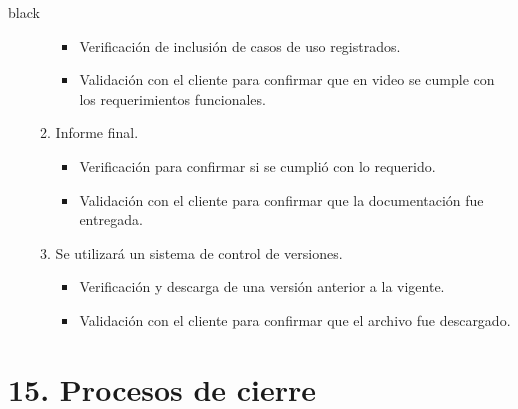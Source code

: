 \documentclass[
11pt, %
codirector, %
]{charter}
\begin{document}
\begin{consigna}{black}
\begin{enumerate}
\begin{enumerate}
			\begin{itemize}
				\item Verificación de inclusión de casos de uso registrados. 
				\item Validación con el cliente para confirmar que en video se cumple con los requerimientos funcionales. 
			\end{itemize}
		\item Informe final.
			\begin{itemize}
				\item Verificación para confirmar si se cumplió con lo requerido. 
				\item Validación con el cliente para confirmar que la documentación fue entregada. 
			\end{itemize}
		\item Se utilizará un sistema de control de versiones.
			\begin{itemize}
				\item Verificación y descarga de una versión anterior a la vigente.
				\item Validación con el cliente para confirmar que el archivo fue descargado.
			\end{itemize}
	\end{enumerate}

\end{enumerate}

\end{consigna}

\section{15. Procesos de cierre}    
\label{sec:cierre}
\end{document}
